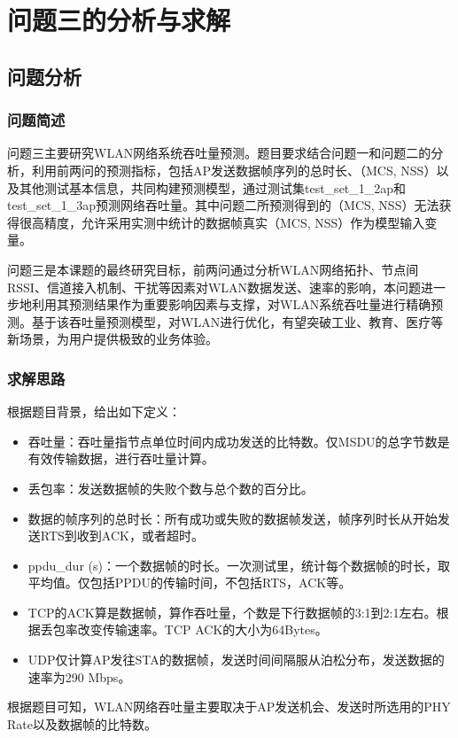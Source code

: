 \documentclass[bwprint]{gmcmthesis}
\begin{document}
\newpage
\section{问题三的分析与求解}
\subsection{问题分析}
\subsubsection{问题简述}
问题三主要研究WLAN网络系统吞吐量预测。题目要求结合问题一和问题二的分析，利用前两问的预测指标，包括AP发送数据帧序列的总时长、（MCS, NSS）以及其他测试基本信息，共同构建预测模型，通过测试集test\_set\_1\_2ap和test\_set\_1\_3ap预测网络吞吐量。其中问题二所预测得到的（MCS, NSS）无法获得很高精度，允许采用实测中统计的数据帧真实（MCS, NSS）作为模型输入变量。

问题三是本课题的最终研究目标，前两问通过分析WLAN网络拓扑、节点间RSSI、信道接入机制、干扰等因素对WLAN数据发送、速率的影响，本问题进一步地利用其预测结果作为重要影响因素与支撑，对WLAN系统吞吐量进行精确预测。基于该吞吐量预测模型，对WLAN进行优化，有望突破工业、教育、医疗等新场景，为用户提供极致的业务体验。
\subsubsection{求解思路}
根据题目背景，给出如下定义：
\begin{itemize}
    \item 吞吐量：吞吐量指节点单位时间内成功发送的比特数。仅MSDU的总字节数是有效传输数据，进行吞吐量计算。
    \item 丢包率：发送数据帧的失败个数与总个数的百分比。
    \item 数据的帧序列的总时长：所有成功或失败的数据帧发送，帧序列时长从开始发送RTS到收到ACK，或者超时。
    \item ppdu\_dur (s)：一个数据帧的时长。一次测试里，统计每个数据帧的时长，取平均值。仅包括PPDU的传输时间，不包括RTS，ACK等。
    \item TCP的ACK算是数据帧，算作吞吐量，个数是下行数据帧的3:1到2:1左右。根据丢包率改变传输速率。TCP ACK的大小为64Bytes。
    \item UDP仅计算AP发往STA的数据帧，发送时间间隔服从泊松分布，发送数据的速率为290 Mbps。
\end{itemize}



根据题目可知，WLAN网络吞吐量主要取决于AP发送机会、发送时所选用的PHY Rate以及数据帧的比特数。
\end{document}
